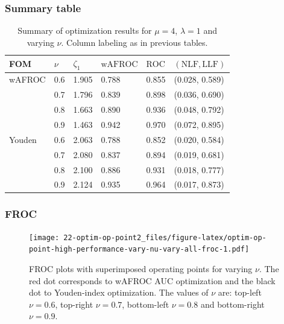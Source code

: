 \documentclass[
]{book}
\begin{document}
\hypertarget{summary-table-8}{%
\subsubsection{Summary table}\label{summary-table-8}}

\begin{table}

\caption{\label{tab:optim-op-point-high-performance-vary-nu-table-vary-all}Summary of optimization results for $\mu = 4$, $\lambda = 1$ and varying $\nu$. Column labeling as in previous tables.}
\centering
\fontsize{10}{12}\selectfont
\begin{tabular}[t]{llllll}
\toprule
FOM & $\nu$ & $\zeta_1$ & $\text{wAFROC}$ & $\text{ROC}$ & $\left( \text{NLF}, \text{LLF}\right)$\\
\midrule
wAFROC & 0.6 & 1.905 & 0.788 & 0.855 & (0.028, 0.589)\\
 & 0.7 & 1.796 & 0.839 & 0.898 & (0.036, 0.690)\\
 & 0.8 & 1.663 & 0.890 & 0.936 & (0.048, 0.792)\\
 & 0.9 & 1.463 & 0.942 & 0.970 & (0.072, 0.895)\\
Youden & 0.6 & 2.063 & 0.788 & 0.852 & (0.020, 0.584)\\
\addlinespace
 & 0.7 & 2.080 & 0.837 & 0.894 & (0.019, 0.681)\\
 & 0.8 & 2.100 & 0.886 & 0.931 & (0.018, 0.777)\\
 & 0.9 & 2.124 & 0.935 & 0.964 & (0.017, 0.873)\\
\bottomrule
\end{tabular}
\end{table}

\hypertarget{froc-9}{%
\subsubsection{FROC}\label{froc-9}}

\begin{figure}
\centering
\texttt{[image: 22-optim-op-point2\_files/figure-latex/optim-op-point-high-performance-vary-nu-vary-all-froc-1.pdf]}
\caption{\label{fig:optim-op-point-high-performance-vary-nu-vary-all-froc}FROC plots with superimposed operating points for varying \(\nu\). The red dot corresponds to wAFROC AUC optimization and the black dot to Youden-index optimization. The values of \(\nu\) are: top-left \(\nu = 0.6\), top-right \(\nu = 0.7\), bottom-left \(\nu = 0.8\) and bottom-right \(\nu = 0.9\).}
\end{figure}
\end{document}
